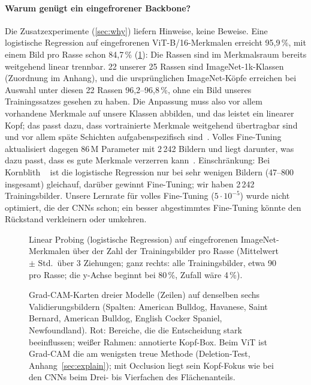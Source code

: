 \paragraph{Warum genügt ein eingefrorener Backbone?}
Die Zusatzexperimente (\cref{sec:why}) liefern Hinweise, keine Beweise. Eine logistische Regression auf
eingefrorenen ViT-B/16-Merkmalen erreicht 95,9\,\%, mit einem Bild pro Rasse schon 84,7\,\%
(\cref{fig:fewshot}): Die Rassen sind im Merkmalsraum bereits weitgehend linear trennbar. 22 unserer
25 Rassen sind ImageNet-1k-Klassen~\cite{russakovsky2015imagenet} (Zuordnung im Anhang), und die
ursprünglichen ImageNet-Köpfe erreichen bei Auswahl unter diesen 22 Rassen 96,2--96,8\,\%, ohne ein Bild
unseres Trainingssatzes gesehen zu haben. Die Anpassung muss also vor allem vorhandene Merkmale auf unsere
Klassen abbilden, und das leistet ein linearer Kopf; das passt dazu, dass vortrainierte Merkmale weitgehend
übertragbar sind und vor allem späte Schichten aufgabenspezifisch sind~\cite{yosinski2014transferable}. Volles
Fine-Tuning aktualisiert dagegen 86\,M Parameter mit 2\,242 Bildern und liegt darunter, was dazu passt,
dass es gute Merkmale verzerren kann~\cite{kumar2022finetuning}. Einschränkung: Bei Kornblith \etal~\cite{kornblith2019transfer} ist die logistische Regression nur bei sehr wenigen
Bildern (47--800 insgesamt) gleichauf, darüber gewinnt Fine-Tuning; wir haben 2\,242 Trainingsbilder. Unsere Lernrate für volles Fine-Tuning ($5\cdot10^{-5}$) wurde nicht
optimiert, die der CNNs schon; ein besser abgestimmtes Fine-Tuning könnte den Rückstand verkleinern oder umkehren.

\begin{figure}[t]
  \centering
  \caption{Linear Probing (logistische Regression) auf eingefrorenen ImageNet-Merkmalen über der Zahl der
  Trainingsbilder pro Rasse (Mittelwert $\pm$ Std.\ über 3 Ziehungen; ganz rechts: alle Trainingsbilder, etwa
  90 pro Rasse; die y-Achse beginnt bei 80\,\%, Zufall wäre 4\,\%).}
  \label{fig:fewshot}
\end{figure}

\begin{figure}[t]
  \centering
  \caption{Grad-CAM-Karten dreier Modelle (Zeilen) auf denselben sechs Validierungsbildern (Spalten: American Bulldog,
  Havanese, Saint Bernard, American Bulldog, English Cocker Spaniel, Newfoundland). Rot: Bereiche, die
  die Entscheidung stark beeinflussen; weißer Rahmen: annotierte Kopf-Box. Beim ViT ist Grad-CAM die am
  wenigsten treue Methode (Deletion-Test, Anhang~\ref{sec:explain}); mit Occlusion liegt sein Kopf-Fokus
  wie bei den CNNs beim Drei- bis Vierfachen des Flächenanteils.}
  \label{fig:head}
\end{figure}

